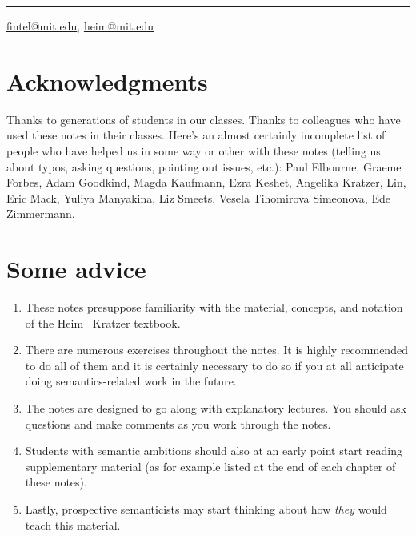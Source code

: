 \plainbreak{1}

\href{mailto:fintel@mit.edu}{fintel@mit.edu}, \href{mailto:heim@mit.edu}{heim@mit.edu}

\cleardoublepage

\null
\vfill \ba 

\section*{Acknowledgments}

Thanks to generations of students in our classes. Thanks to colleagues who have used these notes in their classes. Here's an almost certainly incomplete list of people who have helped us in some way or other with these notes (telling us about typos, asking questions, pointing out issues, etc.): Paul Elbourne, Graeme Forbes, Adam Goodkind, Magda Kaufmann, Ezra Keshet, Angelika Kratzer, Lin, Eric Mack, Yuliya Manyakina, Liz Smeets, Vesela Tihomirova Simeonova, Ede Zimmermann.

\section*{Some advice}
\begin{enumerate}
\item These notes presuppose familiarity with the material, concepts, and notation of the Heim \amp\ Kratzer textbook.
\item There are numerous exercises throughout the notes. It is highly recommended to do all of them and it is certainly necessary to do so if you at all anticipate doing semantics-related work in the future.
\item The notes are designed to go along with explanatory lectures. You should ask questions and make comments as you work through the notes.
\item Students with semantic ambitions should also at an early point start reading supplementary material (as for example listed at the end of each chapter of these notes).
\item Lastly, prospective semanticists may start thinking about how \emph{they} would teach this material.
\end{enumerate}

\ab 
\vfill\null

\newpage\hbox{}
\vfill{\scshape{}}
\vfill\hbox{}\thispagestyle{cleared}

